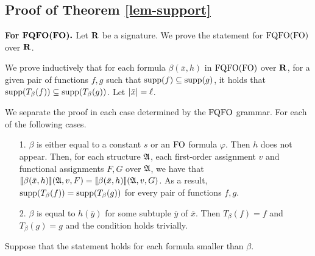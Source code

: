 
\subsection*{Proof of Theorem \ref{lem-support}}

{\bf For }$\boldsymbol{{\rm FQFO}({\rm FO}).}$ Let $\mathbf{R}$ be a signature. We prove the statement for ${\rm FQFO}({\rm FO})$ over $\mathbf{R}$.

We prove inductively that for each formula $\beta(\bar{x},h)$ in ${\rm FQFO}({\rm FO})$ over $\mathbf{R}$, for a given pair of functions $f,g$ such that $\text{\rm supp}(f)\subseteq\text{\rm supp}(g)$, it holds that $\text{\rm supp}(T_{\beta}(f))\subseteq\text{\rm supp}(T_{\beta}(g))$. Let $\vert \bar{x} \vert = \ell$.

We separate the proof in each case determined by the ${\rm FQFO}$ grammar. For each of the following cases.
\begin{itemize}
\item[1.] $\beta$ is either equal to a constant $s$ or an ${\rm FO}$ formula $\varphi$. Then $h$ does not appear. Then, for each structure $\mathfrak{A}$, each first-order assignment $v$ and functional assignments $F,G$ over $\mathfrak{A}$, we have that ${\llbracket{}{\beta(\bar{x},h)}\rrbracket}(\mathfrak{A},v,F) = {\llbracket{}{\beta(\bar{x},h)}\rrbracket}(\mathfrak{A},v,G)$. As a result, $\text{\rm supp}(T_{\beta}(f)) = \text{\rm supp}(T_{\beta}(g))$ for every pair of functions $f,g$.
\item[2.] $\beta$ is equal to $h(\bar{y})$ for some subtuple $\bar{y}$ of $\bar{x}$. Then $T_{\beta}(f) = f$ and $T_{\beta}(g) = g$ and the condition holds trivially.
\end{itemize}
Suppose that the statement holds for each formula smaller than $\beta$.

